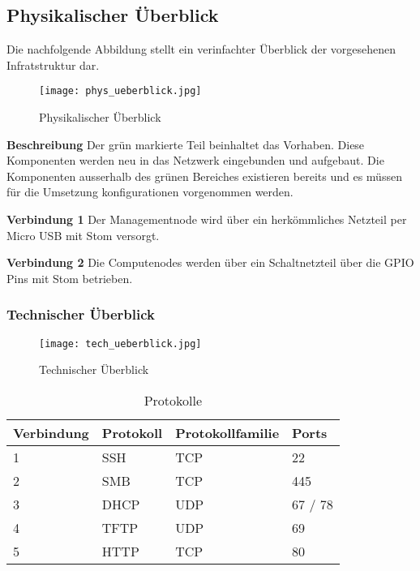 \subsection{Physikalischer Überblick}
Die nachfolgende Abbildung stellt ein verinfachter Überblick der vorgesehenen Infratstruktur dar.

\begin{figure}[htb]
\centering
\texttt{[image: phys\_ueberblick.jpg]}
\caption{Physikalischer Überblick}
\label{fig:Physikalischer Überblick}
\end{figure} 

\textbf{Beschreibung}\newline
Der grün markierte Teil beinhaltet das Vorhaben. Diese Komponenten werden neu in das Netzwerk eingebunden und aufgebaut. Die Komponenten ausserhalb des grünen Bereiches existieren bereits und es müssen für die Umsetzung konfigurationen vorgenommen werden.

\textbf{Verbindung 1} \newline
Der Managementnode wird über ein herkömmliches Netzteil per Micro USB mit Stom versorgt.

\textbf{Verbindung 2} \newline
Die Computenodes werden über ein Schaltnetzteil über die GPIO Pins mit Stom betrieben.


\subsubsection{Technischer Überblick}

\begin{figure}[H]
\centering
\texttt{[image: tech\_ueberblick.jpg]}
\caption{Technischer Überblick}
\label{fig:Technischer Überblick}
\end{figure} 


\begin{table}[H]
\centering
\begin{tabular}{p{1cm}p{5cm}p{5cm}p{5cm}}
\hline
\rowcolor{heading} \textbf{Verbindung} & \textbf{Protokoll} & \textbf{Protokollfamilie} & Ports \\\hline
1 & SSH & TCP & 22 \\\hline
2 & SMB & TCP & 445 \\\hline
3 & DHCP & UDP & 67 / 78 \\\hline
4 & TFTP & UDP & 69 \\\hline
5 & HTTP & TCP & 80 \\\hline
\end{tabular}
\caption{Protokolle}
\end{table}

